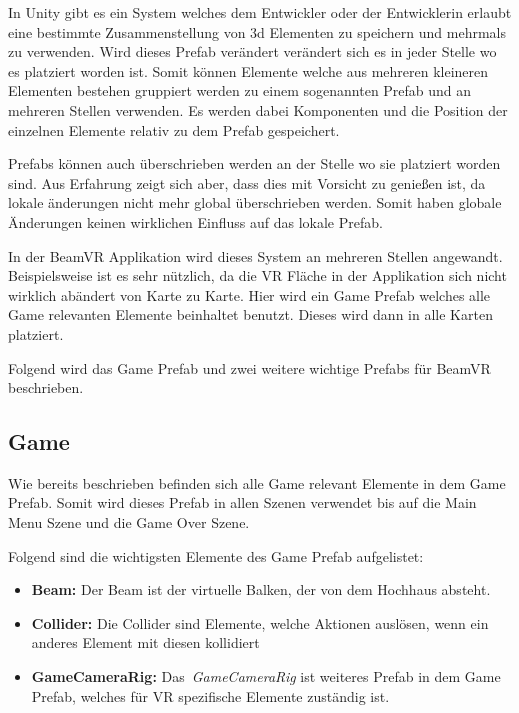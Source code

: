 In Unity gibt es ein System welches dem Entwickler oder der Entwicklerin erlaubt eine bestimmte Zusammenstellung von 3d Elementen zu speichern und mehrmals zu verwenden.
Wird dieses Prefab verändert verändert sich es in jeder Stelle wo es platziert worden ist.
Somit können Elemente welche aus mehreren kleineren Elementen bestehen gruppiert werden zu einem sogenannten Prefab und an mehreren Stellen verwenden.
Es werden dabei Komponenten und die Position der einzelnen Elemente relativ zu dem Prefab gespeichert.

Prefabs können auch überschrieben werden an der Stelle wo sie platziert worden sind.
Aus Erfahrung zeigt sich aber, dass dies mit Vorsicht zu genießen ist, da lokale änderungen nicht mehr global überschrieben werden.
Somit haben globale Änderungen keinen wirklichen Einfluss auf das lokale Prefab.

In der BeamVR Applikation wird dieses System an mehreren Stellen angewandt.
Beispielsweise ist es sehr nützlich, da die VR Fläche in der Applikation sich nicht wirklich abändert von Karte zu Karte.
Hier wird ein Game Prefab welches alle Game relevanten Elemente beinhaltet benutzt.
Dieses wird dann in alle Karten platziert.

Folgend wird das Game Prefab und zwei weitere wichtige Prefabs für BeamVR beschrieben.

\subsection{Game}\label{subsec:game-prefab}

Wie bereits beschrieben befinden sich alle Game relevant Elemente in dem Game Prefab.
Somit wird dieses Prefab in allen Szenen verwendet bis auf die Main Menu Szene und die Game Over Szene.

Folgend sind die wichtigsten Elemente des Game Prefab aufgelistet:

\begin{itemize}
    \item \textbf{Beam:} Der Beam ist der virtuelle Balken, der von dem Hochhaus absteht.
    \item \textbf{Collider:} Die Collider sind Elemente, welche Aktionen auslösen, wenn ein anderes Element mit diesen kollidiert
    \item \textbf{GameCameraRig:} Das~\emph{GameCameraRig} ist weiteres Prefab in dem Game Prefab, welches für VR spezifische Elemente zuständig ist.
\end{itemize}


